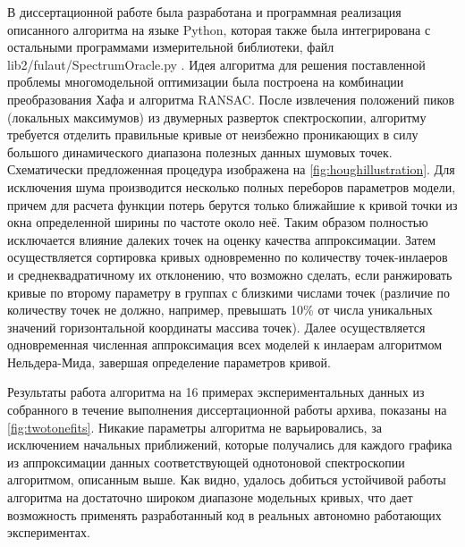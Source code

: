 \documentclass[14pt, a4paper]{extarticle}
\begin{document}
В диссертационной работе была разработана и программная реализация описанного алгоритма на языке Python, которая также была интегрирована с остальными программами измерительной библиотеки, файл \foreignlanguage{english}{lib2/fulaut/SpectrumOracle.py} \cite{fedorov2021github}. Идея алгоритма для решения поставленной проблемы многомодельной оптимизации была построена на комбинации преобразования Хафа и алгоритма RANSAC. После извлечения положений пиков (локальных максимумов) из двумерных разверток спектроскопии, алгоритму требуется отделить правильные кривые от неизбежно проникающих в силу большого динамического диапазона полезных данных шумовых точек. Схематически предложенная процедура изображена на \autoref{fig:houghillustration}. Для исключения шума производится несколько полных переборов параметров модели, причем для расчета функции потерь берутся только ближайшие к кривой точки из окна определенной ширины по частоте около неё. Таким образом полностью исключается влияние далеких точек на оценку качества аппроксимации. Затем осуществляется сортировка кривых одновременно по количеству точек-инлаеров и среднеквадратичному их отклонению, что возможно сделать, если ранжировать кривые по второму параметру в группах с близкими числами точек (различие по количеству точек не должно, например, превышать 10\% от числа уникальных значений горизонтальной координаты массива точек). Далее осуществляется одновременная численная аппроксимация всех моделей к инлаерам алгоритмом Нельдера-Мида, завершая определение параметров кривой.

Результаты работа алгоритма на 16 примерах экспериментальных данных из собранного в течение выполнения диссертационной работы архива, показаны на \autoref{fig:twotonefits}. Никакие параметры алгоритма не варьировались, за исключением начальных приближений, которые получались для каждого графика из аппроксимации данных соответствующей однотоновой спектроскопии алгоритмом, описанным выше. Как видно, удалось добиться устойчивой работы алгоритма на достаточно широком диапазоне модельных кривых, что дает возможность применять разработанный код в реальных автономно работающих экспериментах.
\end{document}
